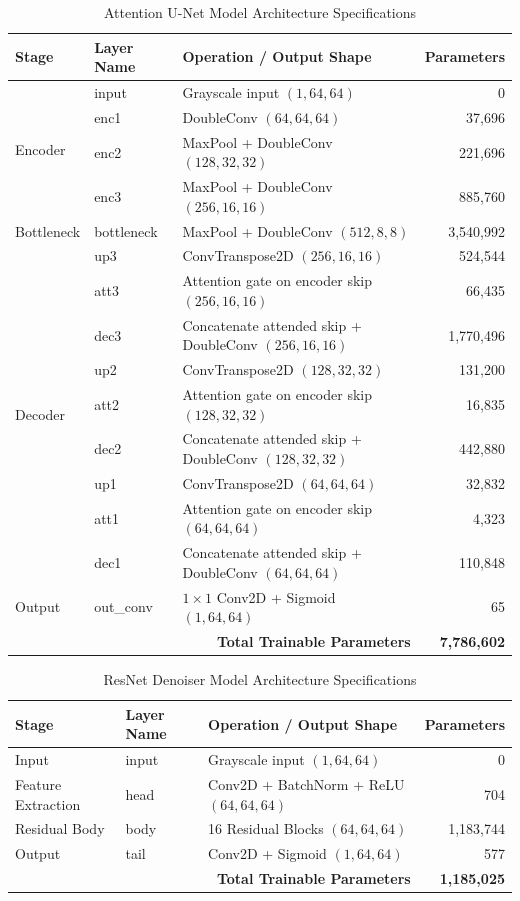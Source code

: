 \documentclass[a4paper,10pt]{article}
\begin{document}
\begin{table}[H]
\centering
\caption{Attention U-Net Model Architecture Specifications}
\begin{tabular}{lllr}
\toprule
\textbf{Stage} & \textbf{Layer Name} & \textbf{Operation / Output Shape} & \textbf{Parameters} \\
\midrule
\multirow{4}{*}{Encoder}
& input & Grayscale input $(1,64,64)$ & 0 \\
& enc1 & DoubleConv $(64,64,64)$ & 37,696 \\
& enc2 & MaxPool + DoubleConv $(128,32,32)$ & 221,696 \\
& enc3 & MaxPool + DoubleConv $(256,16,16)$ & 885,760 \\
\midrule
Bottleneck
& bottleneck & MaxPool + DoubleConv $(512,8,8)$ & 3,540,992 \\
\midrule
\multirow{9}{*}{Decoder}
& up3 & ConvTranspose2D $(256,16,16)$ & 524,544 \\
& att3 & Attention gate on encoder skip $(256,16,16)$ & 66,435 \\
& dec3 & Concatenate attended skip + DoubleConv $(256,16,16)$ & 1,770,496 \\
& up2 & ConvTranspose2D $(128,32,32)$ & 131,200 \\
& att2 & Attention gate on encoder skip $(128,32,32)$ & 16,835 \\
& dec2 & Concatenate attended skip + DoubleConv $(128,32,32)$ & 442,880 \\
& up1 & ConvTranspose2D $(64,64,64)$ & 32,832 \\
& att1 & Attention gate on encoder skip $(64,64,64)$ & 4,323 \\
& dec1 & Concatenate attended skip + DoubleConv $(64,64,64)$ & 110,848 \\
\midrule
Output
& out\_conv & $1\times1$ Conv2D + Sigmoid $(1,64,64)$ & 65 \\
\midrule
\multicolumn{3}{r}{\textbf{Total Trainable Parameters}} & \textbf{7,786,602} \\
\bottomrule
\end{tabular}
\end{table}


\begin{table}[H]
\centering
\caption{ResNet Denoiser Model Architecture Specifications}
\begin{tabular}{lllr}
\toprule
\textbf{Stage} & \textbf{Layer Name} & \textbf{Operation / Output Shape} & \textbf{Parameters} \\
\midrule
Input
& input & Grayscale input $(1,64,64)$ & 0 \\
\midrule
Feature Extraction
& head & Conv2D + BatchNorm + ReLU $(64,64,64)$ & 704 \\
\midrule
Residual Body
& body & 16 Residual Blocks $(64,64,64)$ & 1,183,744 \\
\midrule
Output
& tail & Conv2D + Sigmoid $(1,64,64)$ & 577 \\
\midrule
\multicolumn{3}{r}{\textbf{Total Trainable Parameters}} & \textbf{1,185,025} \\
\bottomrule
\end{tabular}
\end{table}
\end{document}
